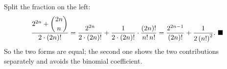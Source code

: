 Split the fraction on the left:
\[\dfrac{2^{2n}+\dbinom{2n}{n}}{2\cdot(2n)!}=\dfrac{2^{2n}}{2\cdot(2n)!}+\dfrac{1}{2\cdot(2n)!}\cdot\dfrac{(2n)!}{n!\,n!}=\dfrac{2^{2n-1}}{(2n)!}+\dfrac{1}{2\left(n!\right)^2}.\ \blacksquare\]
So the two forms are equal; the second one shows the two contributions separately and avoids the binomial coefficient.
